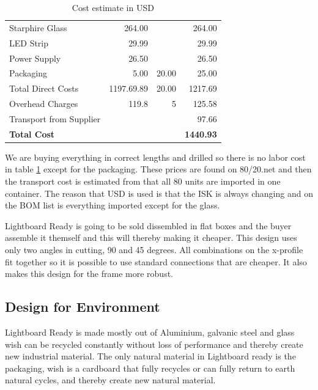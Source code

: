 \documentclass[a4paper]{jpconf}
\begin{document}
\begin{table}[]
\begin{tabular}{lrr|r}
		Starphire Glass & 264.00 & & 264.00 \\
		LED Strip & 29.99 & & 29.99 \\
		Power Supply & 26.50 & & 26.50\\
		Packaging & 5.00 & 20.00 & 25.00 \\ \hline
		Total Direct Costs & 1197.69.89 & 20.00 & 1217.69 \\
		Overhead Charges & 119.8  & 5 & 125.58 \\
		Transport from Supplier & & & 97.66 \\
		\textbf{Total Cost} &   &  & \textbf{1440.93} \\ \hline
	\end{tabular}
	\caption{Cost estimate in USD \cite{8020} \cite{ispan}}
	\label{tab:cost}
\end{table}

We are buying everything in correct lengths and drilled so there is no labor cost in table \ref{tab:cost} except for the packaging.
These prices are found on 80/20.net and then the transport cost is estimated from that all 80 units are imported in one container.
The reason that USD is used is that the ISK is always changing and on the BOM list is everything imported except for the glass. 

Lightboard Ready is going to be sold dissembled  %
in flat boxes and the buyer %
assemble it themself and 
this will %
thereby making it cheaper.
This design uses only two angles in cutting, 90 and 45 degrees.
All combinations on the x-profile fit together so it is possible to use standard connections that are cheaper.
It also makes this design for the frame more robust.
\subsection{Design for Environment}


Lightboard Ready is made mostly out of Aluminium, galvanic steel and glass wish can be recycled constantly without loss of performance and thereby create new industrial material.
The only natural material in Lightboard ready is the packaging, wish is a cardboard that fully recycles or can fully return to earth natural cycles, and thereby create new natural material.
\end{document}

